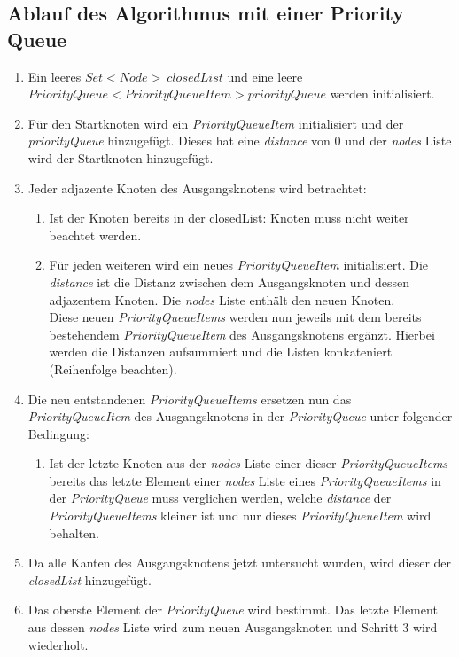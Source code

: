 \documentclass[a4paper]{article}
\begin{document}
\subsection{Ablauf des Algorithmus mit einer Priority Queue}

\begin{enumerate}
    \item Ein leeres $Set<Node>\ closedList$ und eine leere $PriorityQueue<PriorityQueueItem> priorityQueue$ werden initialisiert.
    \item Für den Startknoten wird ein \textit{PriorityQueueItem} initialisiert und der \textit{priorityQueue} hinzugefügt. Dieses hat eine \textit{distance} von 0 und der \textit{nodes} Liste wird der Startknoten hinzugefügt.
    \item Jeder adjazente Knoten des Ausgangsknotens wird betrachtet:
    \begin{enumerate}
        \item Ist der Knoten bereits in der closedList: Knoten muss nicht weiter beachtet werden.
        \item Für jeden weiteren wird ein neues \textit{PriorityQueueItem} initialisiert. Die \textit{distance} ist die Distanz zwischen dem Ausgangsknoten und dessen adjazentem Knoten. Die \textit{nodes} Liste enthält den neuen Knoten.\\Diese neuen \textit{PriorityQueueItems} werden nun jeweils mit dem bereits bestehendem \textit{PriorityQueueItem} des Ausgangsknotens ergänzt. Hierbei werden die Distanzen aufsummiert und die Listen konkateniert (Reihenfolge beachten).
    \end{enumerate}
    \item Die neu entstandenen \textit{PriorityQueueItems} ersetzen nun das \textit{PriorityQueueItem} des Ausgangsknotens in der \textit{PriorityQueue} unter folgender Bedingung:
    \begin{enumerate}
         \item Ist der letzte Knoten aus der \textit{nodes} Liste einer dieser \textit{PriorityQueueItems} bereits das letzte Element einer \textit{nodes} Liste eines \textit{PriorityQueueItems} in der \textit{PriorityQueue} muss verglichen werden, welche \textit{distance} der \textit{PriorityQueueItems} kleiner ist und nur dieses \textit{PriorityQueueItem} wird behalten.
    \end{enumerate}
    \item Da alle Kanten des Ausgangsknotens jetzt untersucht wurden, wird dieser der \textit{closedList} hinzugefügt.
    \item Das oberste Element der \textit{PriorityQueue} wird bestimmt. Das letzte Element aus dessen \textit{nodes} Liste wird zum neuen Ausgangsknoten und Schritt 3 wird wiederholt.

\end{enumerate}
\end{document}
